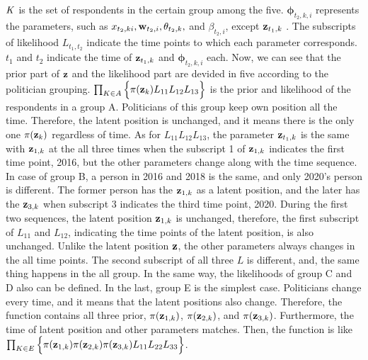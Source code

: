 \documentclass[a4paper, 11pt]{report}
\begin{document}
\quad $\it{K}$ is the set of respondents in the certain group among the five. $\boldsymbol{\phi}_{t_2,k,i}$ represents the parameters, such as $x_{t_2,ki}, {\bf w}_{t_2,i}, \theta_{t_2,k},$ and $\beta_{t_2,i}$, except ${\bf z}_{t_1,k}$ . The subscripts of likelihood $L_{t_1,t_2}$ indicate the time points to which each parameter corresponds. $t_1$ and $t_2$ indicate the time of ${\bf z}_{t_1,k}$ and $\boldsymbol{\phi}_{t_2,k,i}$ each. Now, we can see that the prior part of ${\bf z}$ and the likelihood part are devided in five according to the politician grouping. $\prod_{K\in A}\Big \{\pi({\bf z}_{k}) L_{11} L_{12} L_{13} \Big \}$ is the prior and likelihood of the respondents in a group A. Politicians of this group keep own position all the time. Therefore, the latent position is unchanged, and it means there is the only one $\pi({\bf z}_{k})$ regardless of time. As for $L_{11} L_{12} L_{13}$, the parameter ${\bf z}_{t_1,k}$ is the same with ${\bf z}_{1,k}$ at the all three times when the subscript 1 of ${\bf z}_{1,k}$ indicates the first time point, 2016, but the other parameters change along with the time sequence. In case of group B, a person in 2016 and 2018 is the same, and only 2020's person is different. The former person has the ${\bf z}_{1,k}$ as a latent position, and the later has the ${\bf z}_{3,k}$ when subscript 3 indicates the third time point, 2020. During the first two sequences, the latent position ${\bf z}_{1,k}$ is unchanged, therefore, the first subscript of $L_{11}$ and $L_{12}$, indicating the time points of the latent position, is also unchanged. Unlike the latent position ${\bf z}$, the other parameters always changes in the all time points. The second subscript of all three $L$ is different, and, the same thing happens in the all group. In the same way, the likelihoods of group C and D also can be defined. In the last, group E is the simplest case. Politicians change every time, and it means that the latent positions also change. Therefore, the function contains all three prior, $\pi({\bf z}_{1,k})$, $\pi({\bf z}_{2,k})$, and $\pi({\bf z}_{3,k})$. Furthermore, the time of latent position and other parameters matches. Then, the function is like $\prod_{K\in E}\Big \{\pi({\bf z}_{1,k}) \pi({\bf z}_{2,k}) \pi({\bf z}_{3,k}) L_{11} L_{22} L_{33} \Big \}$.

\end{document}
